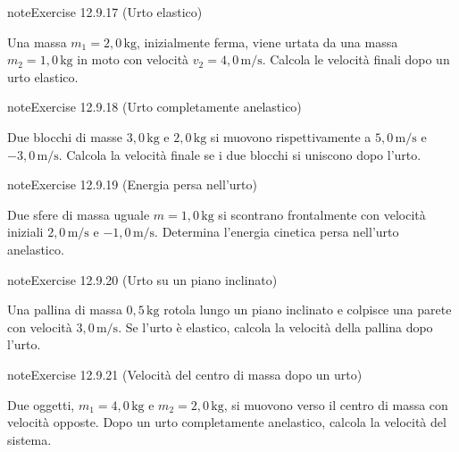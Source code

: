 \documentclass[letterpaper,10pt,italian]{jupyterBook}
\begin{document}
\begin{sphinxadmonition}{note}{Exercise 12.9.17 (Urto elastico)}



\sphinxAtStartPar
Una massa \(m_1 = 2,0 \, \text{kg}\), inizialmente ferma, viene urtata da una massa \(m_2 = 1,0 \, \text{kg}\) in moto con velocità \(v_2 = 4,0 \, \text{m/s}\). Calcola le velocità finali dopo un urto elastico.
\end{sphinxadmonition}
 \label{exercise:ch/mechanics/dynamics-problems-exercise-17}

\begin{sphinxadmonition}{note}{Exercise 12.9.18 (Urto completamente anelastico)}



\sphinxAtStartPar
Due blocchi di masse \(3,0 \, \text{kg}\) e \(2,0 \, \text{kg}\) si muovono rispettivamente a \(5,0 \, \text{m/s}\) e \(-3,0 \, \text{m/s}\). Calcola la velocità finale se i due blocchi si uniscono dopo l’urto.
\end{sphinxadmonition}
 \label{exercise:ch/mechanics/dynamics-problems-exercise-18}

\begin{sphinxadmonition}{note}{Exercise 12.9.19 (Energia persa nell’urto)}



\sphinxAtStartPar
Due sfere di massa uguale \(m = 1,0 \, \text{kg}\) si scontrano frontalmente con velocità iniziali \(2,0 \, \text{m/s}\) e \(-1,0 \, \text{m/s}\). Determina l’energia cinetica persa nell’urto anelastico.
\end{sphinxadmonition}
 \label{exercise:ch/mechanics/dynamics-problems-exercise-19}

\begin{sphinxadmonition}{note}{Exercise 12.9.20 (Urto su un piano inclinato)}



\sphinxAtStartPar
Una pallina di massa \(0,5 \, \text{kg}\) rotola lungo un piano inclinato e colpisce una parete con velocità \(3,0 \, \text{m/s}\). Se l’urto è elastico, calcola la velocità della pallina dopo l’urto.
\end{sphinxadmonition}
 \label{exercise:ch/mechanics/dynamics-problems-exercise-20}

\begin{sphinxadmonition}{note}{Exercise 12.9.21 (Velocità del centro di massa dopo un urto)}



\sphinxAtStartPar
Due oggetti, \(m_1 = 4,0 \, \text{kg}\) e \(m_2 = 2,0 \, \text{kg}\), si muovono verso il centro di massa con velocità opposte. Dopo un urto completamente anelastico, calcola la velocità del sistema.
\end{sphinxadmonition}
\end{document}
